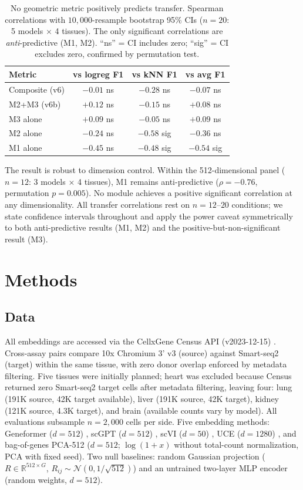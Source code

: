\documentclass[9pt,lineno]{elife}
\begin{document}
\begin{table}[t]
\centering
\caption{No geometric metric positively predicts transfer. Spearman correlations with $10{,}000$-resample bootstrap 95\% CIs ($n = 20$: 5 models $\times$ 4 tissues). The only significant correlations are \emph{anti}-predictive (M1, M2). ``ns'' = CI includes zero; ``sig'' = CI excludes zero, confirmed by permutation test.}
\label{tab:probes}
\small
\begin{tabular}{@{}lccc@{}}
\toprule
Metric & vs logreg F1 & vs kNN F1 & vs avg F1 \\
\midrule
Composite (v6) & $-0.01$ ns & $-0.28$ ns & $-0.07$ ns \\
M2+M3 (v6b) & $+0.12$ ns & $-0.15$ ns & $+0.08$ ns \\
M3 alone & $+0.09$ ns & $-0.05$ ns & $+0.09$ ns \\
M2 alone & $-0.24$ ns & $\mathbf{-0.58}$ sig & $-0.36$ ns \\
M1 alone & $-0.45$ ns & $\mathbf{-0.48}$ sig & $\mathbf{-0.54}$ sig \\
\bottomrule
\end{tabular}
\end{table}

The result is robust to dimension control. Within the 512-dimensional panel ($n = 12$: 3 models $\times$ 4 tissues), M1 remains anti-predictive ($\rho = -0.76$, permutation $p = 0.005$). No module achieves a positive significant correlation at any dimensionality. All transfer correlations rest on $n = 12$--$20$ conditions; we state confidence intervals throughout and apply the power caveat symmetrically to both anti-predictive results (M1, M2) and the positive-but-non-significant result (M3).


\section{Methods}

\subsection{Data}

All embeddings are accessed via the CellxGene Census API (v2023-12-15) \citep{abdulla2025cellxgene}. Cross-assay pairs compare 10x Chromium 3' v3 (source) against Smart-seq2 (target) within the same tissue, with zero donor overlap enforced by metadata filtering. Five tissues were initially planned; heart was excluded because Census returned zero Smart-seq2 target cells after metadata filtering, leaving four: lung (191K source, 42K target available), liver (191K source, 42K target), kidney (121K source, 4.3K target), and brain (available counts vary by model). All evaluations subsample $n = 2{,}000$ cells per side. Five embedding methods: Geneformer ($d = 512$) \citep{theodoris2023geneformer}, scGPT ($d = 512$) \citep{cui2024scgpt}, scVI ($d = 50$) \citep{lopez2018scvi}, UCE ($d = 1280$) \citep{rosen2026uce}, and bag-of-genes PCA-512 ($d = 512$; $\log(1 + x)$ without total-count normalization, PCA with fixed seed). Two null baselines: random Gaussian projection ($R \in \mathbb{R}^{512 \times G}$, $R_{ij} \sim \mathcal{N}(0, 1/\sqrt{512})$) and an untrained two-layer MLP encoder (random weights, $d = 512$).
\end{document}
